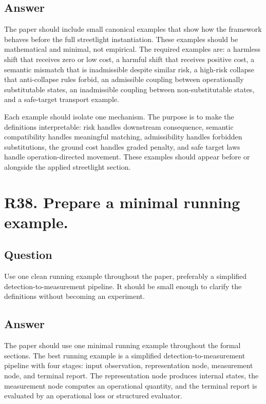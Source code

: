 \documentclass[11pt,a4paper]{article}
\begin{document}
\subsection*{Answer}

The paper should include small canonical examples that show how the framework behaves before the full streetlight instantiation. These examples should be mathematical and minimal, not empirical. The required examples are: a harmless shift that receives zero or low cost, a harmful shift that receives positive cost, a semantic mismatch that is inadmissible despite similar risk, a high-risk collapse that anti-collapse rules forbid, an admissible coupling between operationally substitutable states, an inadmissible coupling between non-substitutable states, and a safe-target transport example.

Each example should isolate one mechanism. The purpose is to make the definitions interpretable: risk handles downstream consequence, semantic compatibility handles meaningful matching, admissibility handles forbidden substitutions, the ground cost handles graded penalty, and safe target laws handle operation-directed movement. These examples should appear before or alongside the applied streetlight section.

\section*{R38. Prepare a minimal running example.}

\subsection*{Question}

Use one clean running example throughout the paper, preferably a simplified detection-to-measurement pipeline. It should be small enough to clarify the definitions without becoming an experiment.

\subsection*{Answer}

The paper should use one minimal running example throughout the formal sections. The best running example is a simplified detection-to-measurement pipeline with four stages: input observation, representation node, measurement node, and terminal report. The representation node produces internal states, the measurement node computes an operational quantity, and the terminal report is evaluated by an operational loss or structured evaluator.
\end{document}

